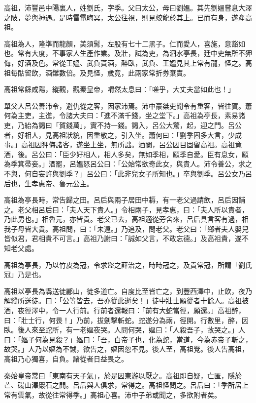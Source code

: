 
\begin{pinyinscope}
高祖，沛豐邑中陽裏人，姓劉氏，字季。父曰太公，母曰劉媼。其先劉媼嘗息大澤之陂，夢與神遇。是時雷電晦冥，太公往視，則見蛟龍於其上。已而有身，遂產高祖。

高祖為人，隆準而龍顏，美須髯，左股有七十二黑子。仁而愛人，喜施，意豁如也。常有大度，不事家人生產作業。及壯，試為吏，為泗水亭長，廷中吏無所不狎侮，好酒及色。常從王媼、武負貰酒，醉臥，武負、王媼見其上常有龍，怪之。高祖每酤留飲，酒讎數倍。及見怪，歲竟，此兩家常折券棄責。

高祖常繇咸陽，縱觀，觀秦皇帝，喟然太息曰：「嗟乎，大丈夫當如此也！」

單父人呂公善沛令，避仇從之客，因家沛焉。沛中豪桀吏聞令有重客，皆往賀。蕭何為主吏，主進，令諸大夫曰：「進不滿千錢，坐之堂下。」高祖為亭長，素易諸吏，乃紿為謁曰「賀錢萬」，實不持一錢。謁入，呂公大驚，起，迎之門。呂公者，好相人，見高祖狀貌，因重敬之，引入坐。蕭何曰：「劉季固多大言，少成事。」高祖因狎侮諸客，遂坐上坐，無所詘。酒闌，呂公因目固留高祖。高祖竟酒，後。呂公曰：「臣少好相人，相人多矣，無如季相，願季自愛。臣有息女，願為季箕帚妾。」酒罷，呂媼怒呂公曰：「公始常欲奇此女，與貴人。沛令善公，求之不與，何自妄許與劉季？」呂公曰：「此非兒女子所知也。」卒與劉季。呂公女乃呂后也，生孝惠帝、魯元公主。

高祖為亭長時，常告歸之田。呂后與兩子居田中耨，有一老父過請飲，呂后因餔之。老父相呂后曰：「夫人天下貴人。」令相兩子，見孝惠，曰：「夫人所以貴者，乃此男也。」相魯元，亦皆貴。老父已去，高祖適從旁舍來，呂后具言客有過，相我子母皆大貴。高祖問，曰：「未遠。」乃追及，問老父。老父曰：「鄉者夫人嬰兒皆似君，君相貴不可言。」高祖乃謝曰：「誠如父言，不敢忘德。」及高祖貴，遂不知老父處。

高祖為亭長，乃以竹皮為冠，令求盜之薛治之，時時冠之，及貴常冠，所謂「劉氏冠」乃是也。

高祖以亭長為縣送徒酈山，徒多道亡。自度比至皆亡之，到豐西澤中，止飲，夜乃解縱所送徒。曰：「公等皆去，吾亦從此逝矣！」徒中壯士願從者十餘人。高祖被酒，夜徑澤中，令一人行前。行前者還報曰：「前有大蛇當徑，願還。」高祖醉，曰：「壯士行，何畏！」乃前，拔劍擊斬蛇。蛇遂分為兩，徑開。行數里，醉，因臥。後人來至蛇所，有一老嫗夜哭。人問何哭，嫗曰：「人殺吾子，故哭之。」人曰：「嫗子何為見殺？」嫗曰：「吾，白帝子也，化為蛇，當道，今為赤帝子斬之，故哭。」人乃以嫗為不誠，欲告之，嫗因忽不見。後人至，高祖覺。後人告高祖，高祖乃心獨喜，自負。諸從者日益畏之。

秦始皇帝常曰「東南有天子氣」，於是因東游以厭之。高祖即自疑，亡匿，隱於芒、碭山澤巖石之閒。呂后與人俱求，常得之。高祖怪問之。呂后曰：「季所居上常有雲氣，故從往常得季。」高祖心喜。沛中子弟或聞之，多欲附者矣。


\end{pinyinscope}
